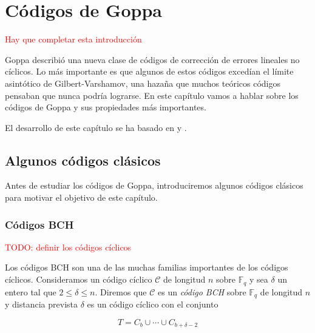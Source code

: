 
\chapter{Códigos de Goppa}

\textcolor{red}{Hay que completar esta introducción}

Goppa describió una nueva clase de códigos de corrección de errores lineales no cíclicos. Lo más importante es que algunos de estos códigos excedían el límite asintótico de Gilbert-Varshamov, una hazaña que muchos teóricos códigos pensaban que nunca podría lograrse. En este capítulo vamos a hablar sobre los códigos de Goppa y sus propiedades más importantes.


El desarrollo de este capítulo se ha basado en \cite{Huffman_Pless_2010} y \cite{Goppa_codes_1973}.

\section{Algunos códigos clásicos}

Antes de estudiar los códigos de Goppa, introduciremos algunos códigos clásicos para motivar el objetivo de este capítulo.

\subsection{Códigos BCH}

\textcolor{red}{TODO: definir los códigos cíclicos}

Los códigos BCH son una de las muchas familias importantes de los códigos cíclicos. Consideramos un código cíclico $\mathcal{C}$ de longitud $n$ sobre $\mathbb{F}_q$ y sea $\delta$ un entero tal que $2 \leq \delta \leq n$. Diremos que $\mathcal{C}$ es un \emph{código BCH} sobre $\mathbb{F}_q$ de longitud $n$ y distancia prevista $\delta$ es un código cíclico con el conjunto

\begin{equation}
    \label{def:conjunto_BCH}
    T = C_b \cup \cdots \cup C_{b + \delta - 2}
\end{equation}

